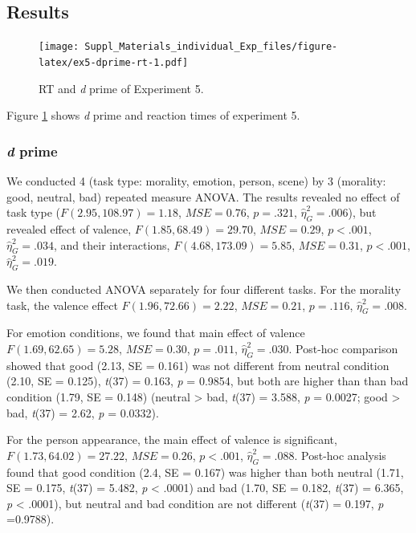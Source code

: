 \documentclass[
  english,
  man]{apa6}
\begin{document}
\hypertarget{results-8}{%
\subsection{Results}\label{results-8}}

\begin{figure}
\centering
\texttt{[image: Suppl\_Materials\_individual\_Exp\_files/figure-latex/ex5-dprime-rt-1.pdf]}
\caption{\label{fig:ex5-dprime-rt}RT and \emph{d} prime of Experiment 5.}
\end{figure}

Figure \ref{fig:ex5-dprime-rt} shows \emph{d} prime and reaction times of experiment 5.

\hypertarget{d-prime-6}{%
\subsubsection{\texorpdfstring{\emph{d} prime}{d prime}}\label{d-prime-6}}

We conducted 4 (task type: morality, emotion, person, scene) by 3 (morality: good, neutral, bad) repeated measure ANOVA. The results revealed no effect of task type (\(F(2.95, 108.97) = 1.18\), \(\mathit{MSE} = 0.76\), \(p = .321\), \(\hat{\eta}^2_G = .006\)), but revealed effect of valence, \(F(1.85, 68.49) = 29.70\), \(\mathit{MSE} = 0.29\), \(p < .001\), \(\hat{\eta}^2_G = .034\), and their interactions, \(F(4.68, 173.09) = 5.85\), \(\mathit{MSE} = 0.31\), \(p < .001\), \(\hat{\eta}^2_G = .019\).

We then conducted ANOVA separately for four different tasks. For the morality task, the valence effect \(F(1.96, 72.66) = 2.22\), \(\mathit{MSE} = 0.21\), \(p = .116\), \(\hat{\eta}^2_G = .008\).

For emotion conditions, we found that main effect of valence \(F(1.69, 62.65) = 5.28\), \(\mathit{MSE} = 0.30\), \(p = .011\), \(\hat{\eta}^2_G = .030\). Post-hoc comparison showed that good (2.13, SE = 0.161) was not different from neutral condition (2.10, SE = 0.125), \emph{t}(37) = 0.163, \emph{p} = 0.9854, but both are higher than than bad condition (1.79, SE = 0.148) (neutral \textgreater{} bad, \emph{t}(37) = 3.588, \emph{p} = 0.0027; good \textgreater{} bad, \emph{t}(37) = 2.62, \emph{p} = 0.0332).

For the person appearance, the main effect of valence is significant, \(F(1.73, 64.02) = 27.22\), \(\mathit{MSE} = 0.26\), \(p < .001\), \(\hat{\eta}^2_G = .088\). Post-hoc analysis found that good condition (2.4, SE = 0.167) was higher than both neutral (1.71, SE = 0.175, \emph{t}(37) = 5.482, \emph{p} \textless{} .0001) and bad (1.70, SE = 0.182, \emph{t}(37) = 6.365, \emph{p} \textless{} .0001), but neutral and bad condition are not different (\emph{t}(37) = 0.197, \emph{p} =0.9788).
\end{document}
